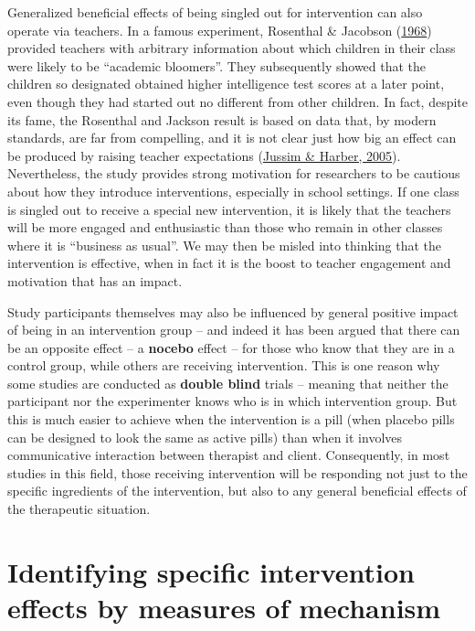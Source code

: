 \documentclass{krantz}
\begin{document}
Generalized beneficial effects of being singled out for intervention can also operate via teachers. In a famous experiment, Rosenthal \& Jacobson (\protect\hyperlink{ref-rosenthal1968}{1968}) provided teachers with arbitrary information about which children in their class were likely to be ``academic bloomers''. They subsequently showed that the children so designated obtained higher intelligence test scores at a later point, even though they had started out no different from other children. In fact, despite its fame, the Rosenthal and Jackson result is based on data that, by modern standards, are far from compelling, and it is not clear just how big an effect can be produced by raising teacher expectations (\protect\hyperlink{ref-jussim2005}{Jussim \& Harber, 2005}). Nevertheless, the study provides strong motivation for researchers to be cautious about how they introduce interventions, especially in school settings. If one class is singled out to receive a special new intervention, it is likely that the teachers will be more engaged and enthusiastic than those who remain in other classes where it is ``business as usual''. We may then be misled into thinking that the intervention is effective, when in fact it is the boost to teacher engagement and motivation that has an impact.

Study participants themselves may also be influenced by general positive impact of being in an intervention group -- and indeed it has been argued that there can be an opposite effect -- a \textbf{nocebo} effect -- for those who know that they are in a control group, while others are receiving intervention. This is one reason why some studies are conducted as \textbf{double blind} trials -- meaning that neither the participant nor the experimenter knows who is in which intervention group. But this is much easier to achieve when the intervention is a pill (when placebo pills can be designed to look the same as active pills) than when it involves communicative interaction between therapist and client. Consequently, in most studies in this field, those receiving intervention will be responding not just to the specific ingredients of the intervention, but also to any general beneficial effects of the therapeutic situation.

\hypertarget{identifying-specific-intervention-effects-by-measures-of-mechanism}{%
\section{Identifying specific intervention effects by measures of mechanism}\label{identifying-specific-intervention-effects-by-measures-of-mechanism}}
\end{document}
